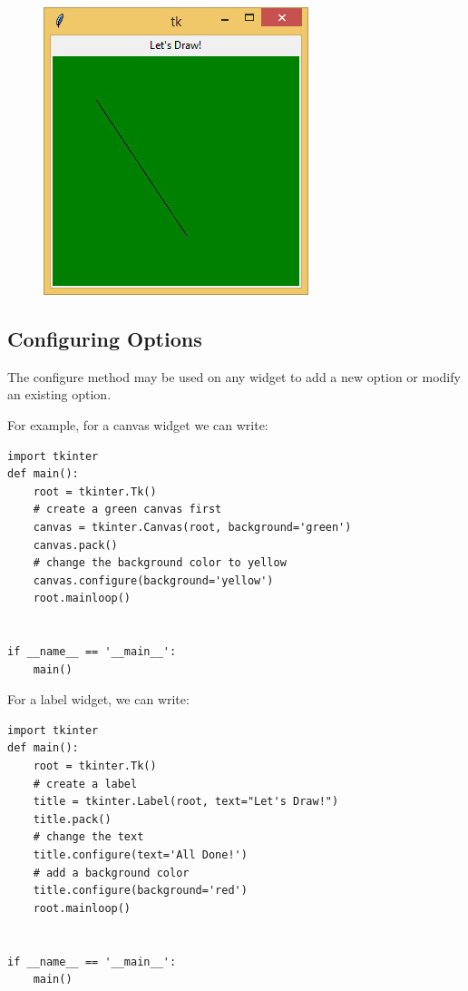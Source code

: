 \documentclass{article}
\begin{document}
\begin{figure}[h]
\includegraphics[scale=.6]{drawline}\\


\end{figure}

\subsection{Configuring Options}

The configure method may be used on any widget to add a new option or modify an existing option.

For example, for a canvas widget we can write:

\begin{lstlisting}
import tkinter
def main():
    root = tkinter.Tk()
    # create a green canvas first
    canvas = tkinter.Canvas(root, background='green')
    canvas.pack()
    # change the background color to yellow
    canvas.configure(background='yellow')
    root.mainloop()


if __name__ == '__main__':
    main()
\end{lstlisting} 

For a label widget, we can write:

\begin{lstlisting}
import tkinter
def main():
    root = tkinter.Tk()
    # create a label
    title = tkinter.Label(root, text="Let's Draw!")
    title.pack()
    # change the text
    title.configure(text='All Done!')
    # add a background color
    title.configure(background='red')
    root.mainloop()


if __name__ == '__main__':
    main()
\end{lstlisting}
 
\end{document}
